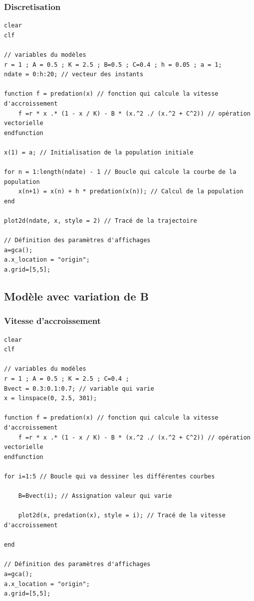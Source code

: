 \documentclass{article}
\begin{document}
\subsubsection{Discretisation}

\begin{verbatim}
clear
clf

// variables du modèles
r = 1 ; A = 0.5 ; K = 2.5 ; B=0.5 ; C=0.4 ; h = 0.05 ; a = 1;
ndate = 0:h:20; // vecteur des instants

function f = predation(x) // fonction qui calcule la vitesse d'accroissement
    f =r * x .* (1 - x / K) - B * (x.^2 ./ (x.^2 + C^2)) // opération vectorielle
endfunction

x(1) = a; // Initialisation de la population initiale

for n = 1:length(ndate) - 1 // Boucle qui calcule la courbe de la population
    x(n+1) = x(n) + h * predation(x(n)); // Calcul de la population
end

plot2d(ndate, x, style = 2) // Tracé de la trajectoire

// Définition des paramètres d'affichages
a=gca();
a.x_location = "origin";
a.grid=[5,5];
\end{verbatim}

\subsection{Modèle avec variation de B}

\subsubsection{Vitesse d'accroissement}

\begin{verbatim}
clear
clf

// variables du modèles
r = 1 ; A = 0.5 ; K = 2.5 ; C=0.4 ;
Bvect = 0.3:0.1:0.7; // variable qui varie
x = linspace(0, 2.5, 301);

function f = predation(x) // fonction qui calcule la vitesse d'accroissement
    f =r * x .* (1 - x / K) - B * (x.^2 ./ (x.^2 + C^2)) // opération vectorielle
endfunction

for i=1:5 // Boucle qui va dessiner les différentes courbes

    B=Bvect(i); // Assignation valeur qui varie

    plot2d(x, predation(x), style = i); // Tracé de la vitesse d'accroissement

end

// Définition des paramètres d'affichages
a=gca();
a.x_location = "origin";
a.grid=[5,5];
\end{verbatim}
\end{document}
